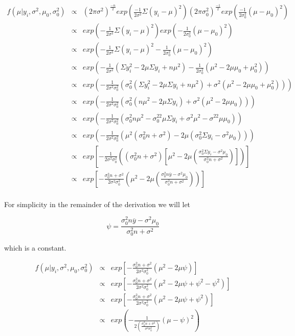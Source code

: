 \documentclass[12pt]{article}
\newcommand{\ybar}{\overline{y}}
\begin{document}
\begin{eqnarray*}
f(\mu|y_i,\sigma^2,\mu_0,\sigma_0^2) &\propto& (2\pi\sigma^2)^{\frac{-n}{2}}exp\left(\frac{-1}{2\sigma^2}\Sigma(y_i-\mu)^2\right)(2\pi\sigma_0^2)^{\frac{-1}{2}}exp\left(\frac{-1}{2\sigma_0^2}(\mu-\mu_0)^2\right) \\
&\propto& exp\left(-\frac{1}{2\sigma^2}\Sigma(y_i-\mu)^2\right)exp\left(-\frac{1}{2\sigma_0^2}(\mu-\mu_0)^2\right) \\
&\propto& exp\left(-\frac{1}{2\sigma^2}\Sigma(y_i-\mu)^2-\frac{1}{2\sigma_0^2}(\mu-\mu_0)^2\right) \\
&\propto& exp\left(-\frac{1}{2\sigma^2}(\Sigma y_i^2-2\mu\Sigma y_i+n\mu^2)-\frac{1}{2\sigma_0^2}(\mu^2-2\mu\mu_0+\mu_0^2)\right) \\
&\propto& exp\left(-\frac{1}{2\sigma^2\sigma_0^2}\left(\sigma_0^2(\Sigma y_i^2-2\mu\Sigma y_i+n\mu^2)+\sigma^2(\mu^2-2\mu\mu_0+\mu_0^2)\right)\right) \\
&\propto& exp\left(-\frac{1}{2\sigma^2\sigma_0^2}\left(\sigma_0^2(n\mu^2-2\mu\Sigma y_i)+\sigma^2(\mu^2-2\mu\mu_0)\right)\right) \\
&\propto& exp\left(-\frac{1}{2\sigma^2\sigma_0^2}\left(\sigma_0^2n\mu^2-\sigma_0^22\mu\Sigma y_i+\sigma^2\mu^2-\sigma^22\mu\mu_0\right)\right) \\
&\propto& exp\left(-\frac{1}{2\sigma^2\sigma_0^2}\left(\mu^2(\sigma_0^2n+\sigma^2)-2\mu(\sigma_0^2\Sigma y_i-\sigma^2\mu_0)\right)\right) \\
&\propto& exp\left[-\frac{1}{2\sigma^2\sigma_0^2}\left((\sigma_0^2n+\sigma^2)\left[\mu^2-2\mu\left(\frac{\sigma_0^2\Sigma y_i-\sigma^2\mu_0}{\sigma_0^2n+\sigma^2}\right)\right]\right)\right] \\
&\propto& exp\left[-\frac{\sigma_0^2n+\sigma^2}{2\sigma^2\sigma_0^2}\left(\mu^2-2\mu\left(\frac{\sigma_0^2n\ybar-\sigma^2\mu_0}{\sigma_0^2n+\sigma^2}\right)\right)\right] \\
\end{eqnarray*}

\noindent For simplicity in the remainder of the derivation we will let 

\[\psi=\frac{\sigma_0^2n\ybar-\sigma^2\mu_0}{\sigma_0^2n+\sigma^2}\]

\noindent which is a constant.

\begin{eqnarray*}
f(\mu|y_i,\sigma^2,\mu_0,\sigma_0^2) &\propto& exp\left[-\frac{\sigma_0^2n+\sigma^2}{2\sigma^2\sigma_0^2}\left(\mu^2-2\mu\psi\right)\right] \\
&\propto& exp\left[-\frac{\sigma_0^2n+\sigma^2}{2\sigma^2\sigma_0^2}\left(\mu^2-2\mu\psi+\psi^2-\psi^2\right)\right] \\
&\propto& exp\left[-\frac{\sigma_0^2n+\sigma^2}{2\sigma^2\sigma_0^2}\left(\mu^2-2\mu\psi+\psi^2\right)\right] \\
&\propto& exp\left(-\frac{1}{2(\frac{\sigma_0^2n+\sigma^2}{\sigma^2\sigma_0^2})}\left(\mu-\psi\right)^2\right) \\
\end{eqnarray*}
\end{document}
